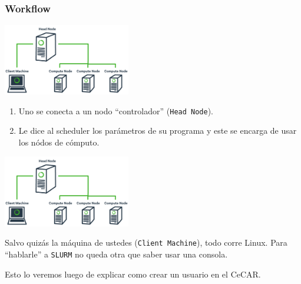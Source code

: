 \documentclass[handout]{beamer}
\begin{document}
\begin{frame}
\frametitle{Workflow}
\begin{center}
\includegraphics[width=15em]{cluster_diagram.png}
\end{center}
\begin{enumerate}
  \item Uno se conecta a un nodo ``controlador'' (\Verb=Head Node=).
  \item Le dice al scheduler los parámetros de su programa y este se encarga de usar los nódos de cómputo.
\end{enumerate}
\end{frame}

\begin{frame}
\begin{center}
\includegraphics[width=15em]{cluster_diagram.png}
\end{center}
Salvo quizás la máquina de ustedes (\Verb=Client Machine=), todo corre Linux. Para ``hablarle'' a \Verb=SLURM= no queda otra que saber usar una consola. 
\vspace{1em}
\pause

Esto lo veremos luego de explicar como crear un usuario en el CeCAR.
\end{frame}
\end{document}
